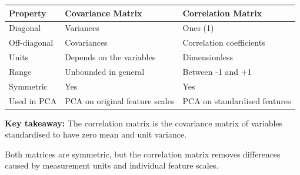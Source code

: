 \documentclass[11pt]{article}
\begin{document}
{\def\LTcaptype{none} %
\begin{longtable}[]{@{}
  >{\raggedright\arraybackslash}p{}
  >{\raggedright\arraybackslash}p{}
  >{\raggedright\arraybackslash}p{}@{}}
\toprule\noalign{}
\begin{minipage}[b]{\linewidth}\raggedright
Property
\end{minipage} & \begin{minipage}[b]{\linewidth}\raggedright
Covariance Matrix
\end{minipage} & \begin{minipage}[b]{\linewidth}\raggedright
Correlation Matrix
\end{minipage} \\
\midrule\noalign{}
\endhead
\bottomrule\noalign{}
\endlastfoot
Diagonal & Variances & Ones (1) \\
Off-diagonal & Covariances & Correlation coefficients \\
Units & Depends on the variables & Dimensionless \\
Range & Unbounded in general & Between -1 and +1 \\
Symmetric & Yes & Yes \\
Used in PCA & PCA on original feature scales & PCA on standardised
features \\
\end{longtable}
}

\textbf{Key takeaway:} The correlation matrix is the covariance matrix
of variables standardised to have zero mean and unit variance.

Both matrices are symmetric, but the correlation matrix removes
differences caused by measurement units and individual feature scales.
\end{document}
